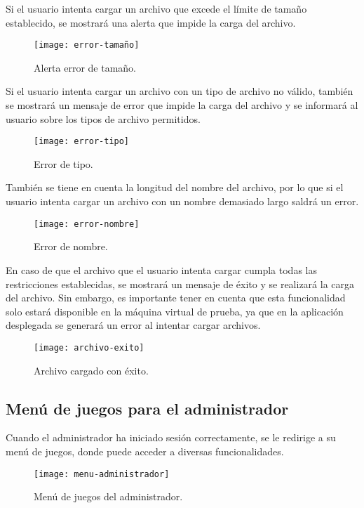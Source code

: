 Si el usuario intenta cargar un archivo que excede el límite de tamaño establecido, se mostrará una alerta que impide la carga del archivo.
\newpage
\begin{figure}[htb]
\centering
\texttt{[image: error-tamaño]}
\caption{Alerta error de tamaño.}
\label{fig:error-tamaño}
\end{figure}

Si el usuario intenta cargar un archivo con un tipo de archivo no válido, también se mostrará un mensaje de error que impide la carga del archivo y se informará al usuario sobre los tipos de archivo permitidos.
\begin{figure}[htb]
\centering
\texttt{[image: error-tipo]}
\caption{Error de tipo.}
\label{fig:error-tipo}
\end{figure}

También se tiene en cuenta la longitud del nombre del archivo, por lo que si el usuario intenta cargar un archivo con un nombre demasiado largo saldrá un error.
\begin{figure}[htb]
\centering
\texttt{[image: error-nombre]}
\caption{Error de nombre.}
\label{fig:error-nombre}
\end{figure}

En caso de que el archivo que el usuario intenta cargar cumpla todas las restricciones establecidas, se mostrará un mensaje de éxito y se realizará la carga del archivo. Sin embargo, es importante tener en cuenta que esta funcionalidad solo estará disponible en la máquina virtual de prueba, ya que en la aplicación desplegada se generará un error al intentar cargar archivos.
\begin{figure}[htb]
\centering
\texttt{[image: archivo-exito]}
\caption{Archivo cargado con éxito.}
\label{fig:archivo-exito}
\end{figure}

\subsection{Menú de juegos para el administrador}
Cuando el administrador ha iniciado sesión correctamente, se le redirige a su menú de juegos, donde puede acceder a diversas funcionalidades.
\begin{figure}[htb]
\centering
\texttt{[image: menu-administrador]}
\caption{Menú de juegos del administrador.}
\label{fig:menu-administrador}
\end{figure}

